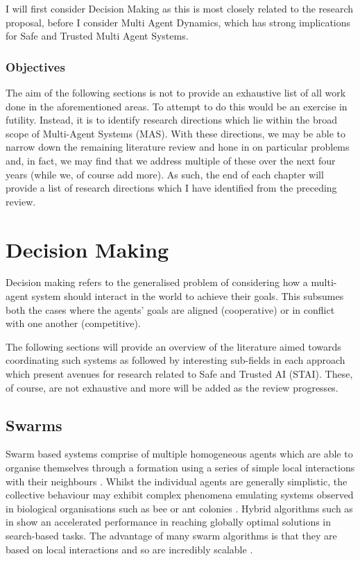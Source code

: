 \documentclass[preprint,8pt]{report}
\begin{document}
I will first consider Decision Making as this is most closely related to the research proposal, before I consider Multi Agent Dynamics, which has strong implications for Safe and Trusted Multi Agent Systems. 

\subsection*{Objectives}

The aim of the following sections is not to provide an exhaustive list of all work done in the aforementioned areas. To attempt to do this would be an exercise in futility. Instead, it is to identify research directions which lie within the broad scope of Multi-Agent Systems (MAS). With these directions, we may be able to narrow down the remaining literature review and hone in on particular problems and, in fact, we may find that we address multiple of these over the next four years (while we, of course add more). As such, the end of each chapter will provide a list of research directions which I have identified from the preceding review. 

\chapter{Decision Making}

Decision making refers to the generalised problem of considering how a multi-agent system should interact in the world to achieve their goals. This subsumes both the cases where the agents' goals are aligned (cooperative) or in conflict with one another (competitive). 

The following sections will provide an overview of the literature aimed towards coordinating such systems as followed by interesting sub-fields in each approach which present avenues for research related to Safe and Trusted AI (STAI). These, of course, are not exhaustive and more will be added as the review progresses.

\section{Swarms}

Swarm based systems comprise of multiple homogeneous agents which are able to organise themselves through a formation using a series of simple local interactions with their neighbours \cite{Couceiro2015}. Whilst the individual agents are generally simplistic, the collective behaviour may exhibit complex phenomena emulating systems observed in biological organisations such as bee or ant colonies \cite{Sethi2017}. Hybrid algorithms such as in \cite{Gao2018} show an accelerated performance in reaching globally optimal solutions in search-based tasks. The advantage of many swarm algorithms is that they are based on local interactions and so are incredibly scalable \cite{Rizk2018}. 
\end{document}

